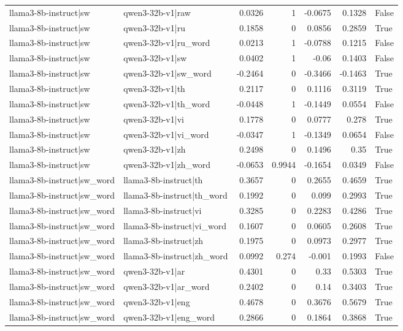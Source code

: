 \begin{table}
\begin{tabular}{l l r r r r l}
llama3-8b-instruct|sw & qwen3-32b-v1|raw & 0.0326 & 1 & -0.0675 & 0.1328 & False \\
llama3-8b-instruct|sw & qwen3-32b-v1|ru & 0.1858 & 0 & 0.0856 & 0.2859 & True \\
llama3-8b-instruct|sw & qwen3-32b-v1|ru_word & 0.0213 & 1 & -0.0788 & 0.1215 & False \\
llama3-8b-instruct|sw & qwen3-32b-v1|sw & 0.0402 & 1 & -0.06 & 0.1403 & False \\
llama3-8b-instruct|sw & qwen3-32b-v1|sw_word & -0.2464 & 0 & -0.3466 & -0.1463 & True \\
llama3-8b-instruct|sw & qwen3-32b-v1|th & 0.2117 & 0 & 0.1116 & 0.3119 & True \\
llama3-8b-instruct|sw & qwen3-32b-v1|th_word & -0.0448 & 1 & -0.1449 & 0.0554 & False \\
llama3-8b-instruct|sw & qwen3-32b-v1|vi & 0.1778 & 0 & 0.0777 & 0.278 & True \\
llama3-8b-instruct|sw & qwen3-32b-v1|vi_word & -0.0347 & 1 & -0.1349 & 0.0654 & False \\
llama3-8b-instruct|sw & qwen3-32b-v1|zh & 0.2498 & 0 & 0.1496 & 0.35 & True \\
llama3-8b-instruct|sw & qwen3-32b-v1|zh_word & -0.0653 & 0.9944 & -0.1654 & 0.0349 & False \\
llama3-8b-instruct|sw_word & llama3-8b-instruct|th & 0.3657 & 0 & 0.2655 & 0.4659 & True \\
llama3-8b-instruct|sw_word & llama3-8b-instruct|th_word & 0.1992 & 0 & 0.099 & 0.2993 & True \\
llama3-8b-instruct|sw_word & llama3-8b-instruct|vi & 0.3285 & 0 & 0.2283 & 0.4286 & True \\
llama3-8b-instruct|sw_word & llama3-8b-instruct|vi_word & 0.1607 & 0 & 0.0605 & 0.2608 & True \\
llama3-8b-instruct|sw_word & llama3-8b-instruct|zh & 0.1975 & 0 & 0.0973 & 0.2977 & True \\
llama3-8b-instruct|sw_word & llama3-8b-instruct|zh_word & 0.0992 & 0.274 & -0.001 & 0.1993 & False \\
llama3-8b-instruct|sw_word & qwen3-32b-v1|ar & 0.4301 & 0 & 0.33 & 0.5303 & True \\
llama3-8b-instruct|sw_word & qwen3-32b-v1|ar_word & 0.2402 & 0 & 0.14 & 0.3403 & True \\
llama3-8b-instruct|sw_word & qwen3-32b-v1|eng & 0.4678 & 0 & 0.3676 & 0.5679 & True \\
llama3-8b-instruct|sw_word & qwen3-32b-v1|eng_word & 0.2866 & 0 & 0.1864 & 0.3868 & True \\

\end{tabular}
\end{table}
